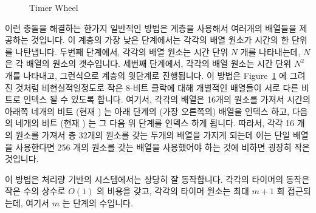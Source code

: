 \begin{figure}[tb]
\centering
{}
\caption{Timer Wheel}
\label{fig:rt:Timer Wheel}
\end{figure}

이런 충돌을 해결하는 한가지 일반적인 방법은 계층을 사용해서 여러개의 배열들을
제공하는 것입니다.
이 계층의 가장 낮은 단계에서는 각각의 배열 원소가 시간의 한 단위를 나탄냅니다.
두번째 단계에서, 각각의 배열 원소는 시간 단위 $N$ 개를 나타내는데, $N$ 은 각
배열의 원소의 갯수입니다.
세번째 단계에서, 각각의 배열 원소는 시간 단위 $N^2$ 개를 나타내고, 그런식으로
계층의 윗단계로 진행됩니다.
이 방법은
Figure~\ref{fig:rt:Timer Wheel}
에 그려진 것처럼 비현실적일정도로 작은 8-비트 클락에 대해 개별적인 배열들이
서로 다른 비트로 인덱스 될 수 있도록 합니다.
여기서, 각각의 배열은 16개의 원소를 가져서 시간의 아래쪽 네개의 비트 (현재
) 는 아래 단계의 (가장 오른쪽의) 배열을 인덱스 하고, 다음의 네개의 비트
(현재 ) 는 그 다음 위 단계를 인덱스 하게 됩니다.
따라서, 각각 16 개의 원소를 가져서 총 32개의 원소를 갖는 두개의 배열을 가지게
되는데 이는 단일 배열을 사용한다면 256 개의 원소를 갖는 배열을 사용했어야 하는
것에 비하면 굉장히 작은 것입니다.

이 방법은 처리량 기반의 시스템에서는 상당히 잘 동작합니다.
각각의 타이머의 동작은 작은 수의 상수로 $O(1)$ 의 비용을 갖고, 각각의 타이머
원소는 최대 $m+1$ 회 접근되는데, 여기서 $m$ 는 단계의 수입니다.

